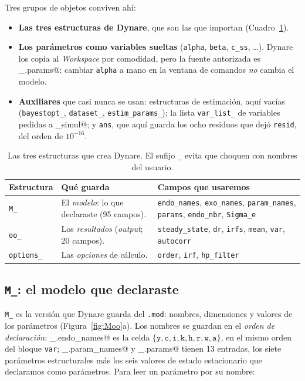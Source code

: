 \documentclass[11pt,a4paper]{report}
\newcommand{\code}[1]{\texttt{#1}}
\begin{document}
\noindent Tres grupos de objetos conviven ahí:
\begin{itemize}[nosep,leftmargin=1.4em]
\item \textbf{Las tres estructuras de Dynare}, que son las que importan
  (Cuadro~\ref{tab:estructuras}).
\item \textbf{Los parámetros como variables sueltas} (\code{alpha}, \code{beta},
  \code{c\_ss}, \ldots). Dynare los copia al \emph{Workspace} por comodidad, pero la
  fuente autorizada es \lstinline@M_.params@: cambiar \code{alpha} a mano en la ventana
  de comandos \emph{no} cambia el modelo.
\item \textbf{Auxiliares} que casi nunca se usan: estructuras de estimación, aquí
  vacías (\code{bayestopt\_}, \code{dataset\_}, \code{estim\_params\_}); la lista
  \code{var\_list\_} de variables pedidas a \lstinline@stoch_simul@; y \code{ans}, que
  aquí guarda los ocho residuos que dejó \code{resid}, del orden de $10^{-16}$.
\end{itemize}

\begin{table}[H]
\centering\small
\begin{tabular}{lp{4.3cm}p{6.3cm}}
\toprule
\textbf{Estructura} & \textbf{Qué guarda} & \textbf{Campos que usaremos}\\
\midrule
\code{M\_}       & El \emph{modelo}: lo que declaraste (95 campos).
                 & \code{endo\_names}, \code{exo\_names}, \code{param\_names},
                   \code{params}, \code{endo\_nbr}, \code{Sigma\_e}\\
\code{oo\_}      & Los \emph{resultados} (\emph{output}; 20 campos).
                 & \code{steady\_state}, \code{dr}, \code{irfs}, \code{mean},
                   \code{var}, \code{autocorr}\\
\code{options\_} & Las \emph{opciones} de cálculo.
                 & \code{order}, \code{irf}, \code{hp\_filter}\\
\bottomrule
\end{tabular}
\caption{Las tres estructuras que crea Dynare. El sufijo \code{\_} evita que choquen
con nombres del usuario.}
\label{tab:estructuras}
\end{table}

\subsection{\texttt{M\_}: el modelo que declaraste}

\code{M\_} es la versión que Dynare guarda del \code{.mod}: nombres, dimensiones y
valores de los parámetros (Figura~\ref{fig:Moo}a). Los nombres se guardan en
el \emph{orden de declaración}: \mbox{\lstinline@M_.endo_names@} es la celda
$\{\code{y},\code{c},\code{i},\code{k},\code{h},\code{r},\code{w},\code{a}\}$, en el
mismo orden del bloque \code{var}; \lstinline@M_.param_names@ y \lstinline@M_.params@
tienen 13 entradas, los siete parámetros estructurales más los seis valores de estado
estacionario que declaramos como parámetros. Para leer un parámetro por su nombre:
\end{document}
